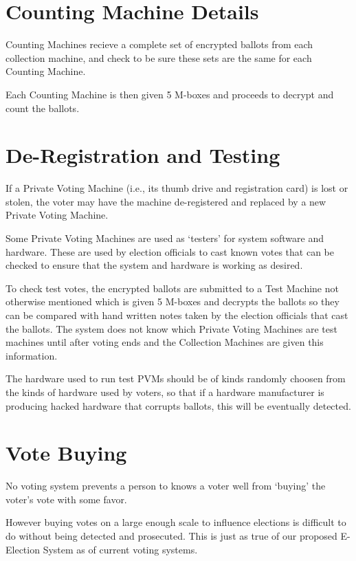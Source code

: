 \documentclass[12pt]{article}
\begin{document}
\section{Counting Machine Details}

Counting Machines recieve a complete set of encrypted ballots
from each collection machine, and check to be sure these sets
are the same for each Counting Machine.

Each Counting Machine is then given 5 M-boxes and proceeds to
decrypt and count the ballots.

\section{De-Registration and Testing}

If a Private Voting Machine (i.e., its thumb drive and registration
card) is lost or stolen, the voter may have the machine
de-registered\label{DE-REGISTERED}
and replaced by a new Private Voting Machine.

Some Private Voting Machines are used as `testers'\label{TESTER} for
system software and hardware.
These are used by election officials to cast known votes that can
be checked to ensure that the system and hardware is working as
desired.

To check test votes, the encrypted ballots are submitted to a Test
Machine not otherwise mentioned which is given 5 M-boxes and
decrypts the ballots so they can be compared with hand written
notes taken by the election officials that cast the ballots.
The system does not know which Private Voting Machines are test
machines until after voting ends and the Collection Machines
are given this information.

The hardware used to run test PVMs should be of kinds randomly
choosen from the kinds of hardware used by voters, so that if a
hardware manufacturer is producing hacked hardware that corrupts
ballots, this will be eventually detected.

\section{Vote Buying}

No voting system prevents a person to knows a voter well from
`buying' the voter's vote with some favor.

However buying votes on a large enough scale to influence elections
is difficult to do without being detected and prosecuted.
This is just as true of our proposed E-Election System as of
current voting systems.
\end{document}
